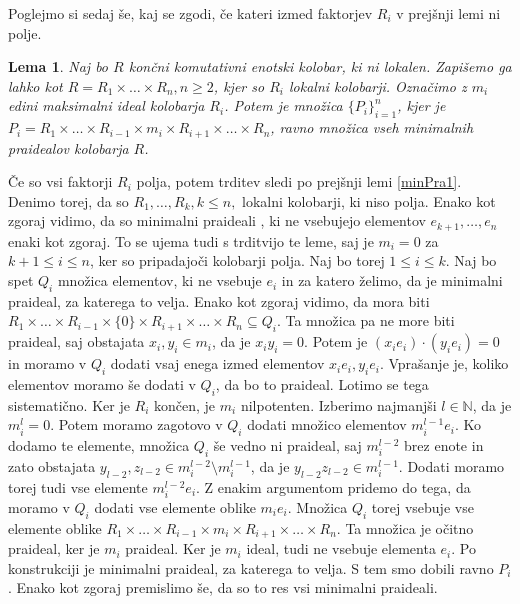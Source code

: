 \documentclass[a4paper, 12pt]{amsart}
\theoremstyle{definition} %
\theoremstyle{plain} %
\newtheorem{lema}[definicija]{Lema}
\newcommand{\N}{\mathbb N}
\begin{document}
Poglejmo si sedaj še, kaj se zgodi, če kateri izmed faktorjev $R_i$ v prejšnji lemi ni polje.

\begin{lema}
\label{minPra2}
Naj bo $R$ končni komutativni enotski kolobar, ki ni lokalen. Zapišemo ga lahko kot $R = R_1 \times \dots \times R_n, n\ge2$, kjer so $R_i$ lokalni kolobarji. Označimo z $m_i$ edini maksimalni ideal kolobarja $R_i$. Potem je množica $\{P_i\}_{i=1}^n$, kjer je $P_i = R_1 \times \dots \times R_{i-1} \times m_i \times R_{i+1} \times \dots \times R_n$, ravno množica vseh minimalnih praidealov kolobarja $R$.
\end{lema}

\proof
Če so vsi faktorji $R_i$ polja, potem trditev sledi po prejšnji lemi \ref{minPra1}. Denimo torej, da so $R_1, \dots,R_k, k\le n,$ lokalni kolobarji, ki niso polja. Enako kot zgoraj vidimo, da so minimalni praideali , ki ne vsebujejo elementov $e_{k+1}, \dots, e_n$ enaki kot zgoraj. To se ujema tudi s trditvijo te leme, saj je $m_i = 0$ za $k+1 \le i \le n$, ker so pripadajoči kolobarji polja. 
Naj bo torej $1 \le i \le k$. Naj bo spet $Q_i$ množica elementov, ki ne vsebuje $e_i$ in za katero želimo, da je minimalni praideal, za katerega to velja. Enako kot zgoraj vidimo, da mora biti $R_1 \times \dots \times R_{i-1} \times \{0\} \times R_{i+1} \times \dots \times R_n \subseteq Q_i$. Ta množica pa ne more biti praideal, saj obstajata $x_i,y_i\in m_i$, da je $x_i y_i = 0$. Potem je $(x_i e_i ) \cdot (y_i e_i) = 0$ in moramo v $Q_i$ dodati vsaj enega izmed elementov $x_i e_i, y_i e_i$. Vprašanje je, koliko elementov moramo še dodati v $Q_i$, da bo to praideal. Lotimo se tega sistematično. Ker je $R_i$ končen, je $m_i$ nilpotenten. Izberimo najmanjši $l\in  \N$, da je $m_i^l = 0$. Potem moramo zagotovo v $Q_i$ dodati množico elementov $m_i^{l-1} e_i$. Ko dodamo te elemente, množica $Q_i$ še vedno ni praideal, saj $m_i^{l-2}$ brez enote in zato obstajata $y_{l-2},z_{l-2}\in m_i^{l-2} \setminus m_i^{l-1}$, da je $y_{l-2}z_{l-2} \in m_i^{l-1}$. Dodati moramo torej tudi vse elemente $m_i^{l-2}e_i$. Z enakim argumentom pridemo do tega, da moramo v $Q_i$ dodati vse elemente oblike $m_i e_i$. Množica $Q_i$ torej vsebuje vse elemente oblike $R_1 \times \dots \times R_{i-1} \times m_i \times R_{i+1} \times \dots \times R_n$. Ta množica je očitno praideal, ker je $m_i$ praideal. Ker je $m_i$ ideal, tudi ne vsebuje elementa $e_i$. Po konstrukciji je minimalni praideal, za katerega to velja. S tem smo dobili ravno $P_i$.
Enako kot zgoraj premislimo še, da so to res vsi minimalni praideali.
\endproof
\end{document}
